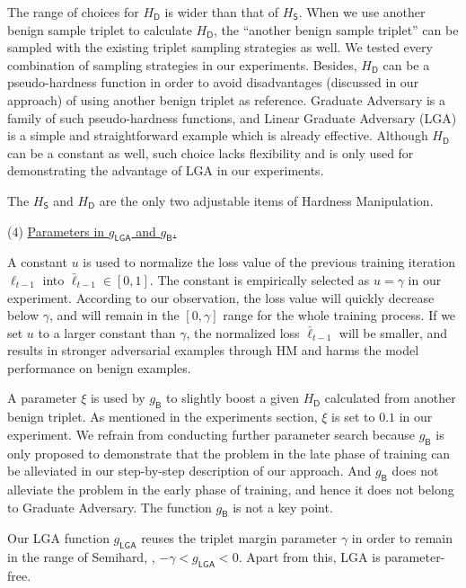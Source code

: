 The range of choices for $H_\mathsf{D}$ is wider than that of $H_\mathsf{S}$.
%
When we use another benign sample triplet to calculate $H_\mathsf{D}$, the
``another benign sample triplet'' can be sampled with the existing triplet
sampling strategies as well.
%
We tested every combination of sampling strategies in our experiments.
%
Besides, $H_\mathsf{D}$ can be a pseudo-hardness function in order to avoid
disadvantages (discussed in our approach) of using another benign triplet as
reference.
%
Graduate Adversary is a family of such pseudo-hardness functions, and Linear
Graduate Adversary (LGA) is a simple and straightforward example which is
already effective.
%
Although $H_\mathsf{D}$ can be a constant as well, such choice lacks
flexibility and is only used for demonstrating the advantage of LGA in our
experiments.

The $H_\mathsf{S}$ and $H_\mathsf{D}$ are the only two adjustable items of
Hardness Manipulation.

(4) \ul{Parameters in $g_\mathsf{LGA}$ and $g_\mathsf{B}$.}

A constant $u$ is used to normalize the loss value of the previous training
iteration $\ell_{t-1}$ into $\bar{\ell}_{t-1}\in[0,1]$.
%
The constant is empirically selected as $u=\gamma$ in our experiment.
%
According to our observation, the loss value will quickly decrease below
$\gamma$, and will remain in the $[0,\gamma]$ range for the whole training
process.
%
If we set $u$ to a larger constant than $\gamma$, the normalized loss
$\bar{\ell}_{t-1}$ will be smaller, and results in stronger adversarial
examples through HM and harms the model performance on benign examples.

A parameter $\xi$ is used by $g_\mathsf{B}$ to slightly boost a given
$H_\mathsf{D}$ calculated from another benign triplet.
%
As mentioned in the experiments section, $\xi$ is set to $0.1$ in our
experiment.
%
We refrain from conducting further parameter search because $g_\mathsf{B}$
is only proposed to demonstrate that the problem in the late phase of
training can be alleviated in our step-by-step description of our approach.
%
And $g_\mathsf{B}$ does not alleviate the problem in the early phase of
training, and hence it does not belong to Graduate Adversary.
%
The function $g_\mathsf{B}$ is not a key point.

Our LGA function $g_\mathsf{LGA}$ reuses the triplet margin parameter $\gamma$
in order to remain in the range of Semihard, \ie, $-\gamma<g_\mathsf{LGA}<0$.
%
Apart from this, LGA is parameter-free.

